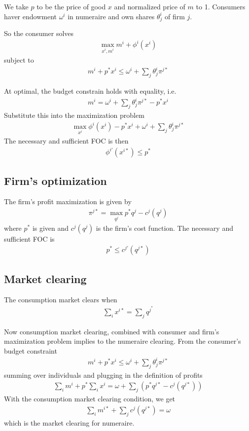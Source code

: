 \documentclass[twocolumn, fleqn]{article}
\begin{document}
		We take $p$ to be the price of good $x$ and normalized price of $m$ to 1. Consumers haver endowment $\omega^i$ in numeraire and own shares $\theta_j^i$ of firm $j$.
		
		So the consumer solves 
		\begin{align*}
			\max_{x^i, m^i} m^i + \phi^i(x^i)
		\end{align*}
		subject to 
		\begin{align*}
			m^i + p^\ast x^i \leq \omega^i + \sum_j \theta^i_j \pi^{j\ast}
		\end{align*}
		
		At optimal, the budget constrain holds with equality, i.e. 
		\begin{align*}
			m^i = \omega^i + \sum_j \theta^i_j \pi^{j\ast} - p^\ast x^i
		\end{align*}
		Substitute this into the maximization problem 
		\begin{align*}
			\max_{x^i} \phi^i (x^i) - p^\ast x^i + \omega^i + \sum_j \theta^i_j \pi^{j\ast}
		\end{align*}
		The necessary and sufficient FOC is then 
		\begin{align*}
			\phi^{i \prime}(x^{i\ast})\leq p^\ast
		\end{align*}
		
		\subsection{Firm's optimization}
		The firm's profit maximization is given by
		\begin{align*}
			\pi^{j\ast} = \max_{q^j} p^\ast q^j - c^j (q^j)
		\end{align*}
		where $p^\ast$ is given and $c^j(q^j)$ is the firm's cost function. The necessary and sufficient FOC is 
		\begin{align*}
			p^\ast \leq c^{j\prime} (q^{j\ast})
		\end{align*}
		
		\subsection{Market clearing}
		The consumption market clears when 
		\begin{align*}
			\sum_i x^{i \ast} = \sum_j q^{j^\ast}
		\end{align*}
		
		Now consumption market clearing, combined with consumer and firm's maximization problem implies to the numeraire clearing. From the consumer's budget constraint
		\begin{align*}
			m^i + p^\ast x^i \leq \omega^i + \sum_j \theta^i_j \pi^{j\ast}
		\end{align*}
		summing over individuals and plugging in the definition of profits 
		\begin{align*}
			\sum_i m^i + p^\ast \sum_i x^i = \omega + \sum_j (p^\ast q^{j \ast}-c^j (q^{j\ast}))
		\end{align*}
		With the consumption market clearing condition, we get
		\begin{align*}
			\sum_i m^{i\ast} + \sum_j c^j (q^{j \ast})=\omega
		\end{align*}
		which is the market clearing for numeraire.
		
\end{document}

